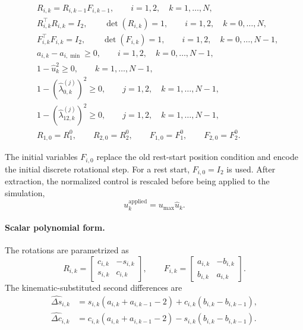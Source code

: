 \begin{subequations}
\begin{align}
&
R_{i,k}
=
R_{i,k-1}F_{i,k-1},
\qquad
i=1,2,\quad k=1,\ldots,N,
\label{eq:forced_acrobot_reduced_model2_kinematics}
\\
&
R_{i,k}^{\top}R_{i,k}=I_2,
\qquad
\det(R_{i,k})=1,
\qquad
i=1,2,\quad k=0,\ldots,N,
\label{eq:forced_acrobot_reduced_model2_SO2_R}
\\
&
F_{i,k}^{\top}F_{i,k}=I_2,
\qquad
\det(F_{i,k})=1,
\qquad
i=1,2,\quad k=0,\ldots,N-1,
\label{eq:forced_acrobot_reduced_model2_SO2_F}
\\
&
a_{i,k}-a_{i,\min}\ge 0,
\qquad
i=1,2,\quad k=0,\ldots,N-1,
\label{eq:forced_acrobot_reduced_model2_step_bound}
\\
&
1-\hat u_k^2\ge 0,
\qquad
k=1,\ldots,N-1,
\label{eq:forced_acrobot_reduced_model2_input_bound}
\\
&
1-\left(\hat\lambda_{0,k}^{(j)}\right)^2\ge 0,
\qquad
j=1,2,\quad k=1,\ldots,N-1,
\label{eq:forced_acrobot_reduced_model2_lambda0_bound}
\\
&
1-\left(\hat\lambda_{12,k}^{(j)}\right)^2\ge 0,
\qquad
j=1,2,\quad k=1,\ldots,N-1,
\label{eq:forced_acrobot_reduced_model2_lambda12_bound}
\\
&
R_{1,0}=R_1^0,
\qquad
R_{2,0}=R_2^0,
\qquad
F_{1,0}=F_1^0,
\qquad
F_{2,0}=F_2^0.
\label{eq:forced_acrobot_reduced_model2_initial_rotation}
\end{align}
\end{subequations}

The initial variables \(F_{i,0}\) replace the old rest-start position condition and
encode the initial discrete rotational step. For a rest start, \(F_{i,0}=I_2\) is used.
After extraction, the normalized control is rescaled before being applied to the
simulation,
\[
u_k^{\mathrm{applied}}=u_{\max}\hat u_k.
\]

\paragraph{Scalar polynomial form.}
The rotations are parametrized as
\[
R_{i,k}
=
\begin{bmatrix}
c_{i,k} & -s_{i,k}\\
s_{i,k} & c_{i,k}
\end{bmatrix},
\qquad
F_{i,k}
=
\begin{bmatrix}
a_{i,k} & -b_{i,k}\\
b_{i,k} & a_{i,k}
\end{bmatrix}.
\]
The kinematic-substituted second differences are
\begin{align}
\widehat{\Delta s}_{i,k}
&=
s_{i,k}
\left(
a_{i,k}+a_{i,k-1}-2
\right)
+
c_{i,k}
\left(
b_{i,k}-b_{i,k-1}
\right),
\label{eq:reduced_model2_delta_s}
\\
\widehat{\Delta c}_{i,k}
&=
c_{i,k}
\left(
a_{i,k}+a_{i,k-1}-2
\right)
-
s_{i,k}
\left(
b_{i,k}-b_{i,k-1}
\right).
\label{eq:reduced_model2_delta_c}
\end{align}

